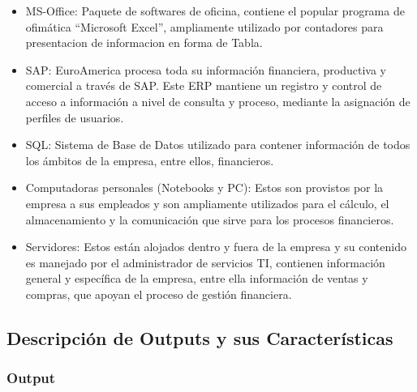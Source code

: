 {	
	\vspace{3mm}
	
	
	\begin{itemize}
	\item MS-Office: Paquete de softwares de oficina, contiene el popular programa de ofimática “Microsoft Excel”, ampliamente utilizado por contadores para presentacion de informacion en forma de Tabla.
	\item SAP: EuroAmerica procesa toda su información financiera, productiva y comercial a través de SAP. Este ERP mantiene un registro y control de acceso a información a nivel de consulta y proceso, mediante la asignación de perfiles de usuarios.
	\item SQL: Sistema de Base de Datos utilizado para contener información de todos los ámbitos de la empresa, entre ellos, financieros.
	\end{itemize}
	
	\vspace{3mm}
	
	
	\begin{itemize}
	\item Computadoras personales (Notebooks y PC): Estos son provistos por la empresa a sus empleados y son ampliamente utilizados para el cálculo, el almacenamiento y la comunicación que sirve para los procesos financieros.
	\item Servidores: Estos están alojados dentro y fuera de la empresa y su contenido es manejado por el administrador de servicios TI, contienen información general y específica de la empresa, entre ella información de ventas y compras, que apoyan el proceso de gestión financiera.
	\end{itemize}
	
	\subsection{Descripción de Outputs y sus Características}
	
	\subsubsection{Output}
	
	\\\\
	\\\\
}

